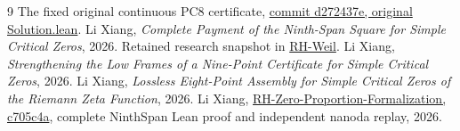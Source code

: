 \documentclass[11pt,a4paper]{article}
\begin{document}
\begin{thebibliography}{9}
 The fixed original continuous PC8 certificate,
\href{https://github.com/josusanmartin/riemann/blob/d272437e7ebeb17b87c8c3d7cece592aa23785ab/submissions/dani-bound-2026/proof/Solution.lean}{commit d272437e, original Solution.lean}.
 Li Xiang, \emph{Complete Payment of the Ninth-Span
Square for Simple Critical Zeros}, 2026. Retained research snapshot
in \href{https://github.com/lixiang90/RH-Weil}{RH-Weil}.
 Li Xiang, \emph{Strengthening the Low Frames of a
Nine-Point Certificate for Simple Critical Zeros}, 2026.
 Li Xiang, \emph{Lossless Eight-Point Assembly for
Simple Critical Zeros of the Riemann Zeta Function}, 2026.
 Li Xiang,
\href{https://github.com/lixiang90/RH-Zero-Proportion-Formalization/tree/c705c4aad2ad33e5358ce17e906b0dc51b1a83fe}{RH-Zero-Proportion-Formalization, c705c4a},
complete NinthSpan Lean proof and independent nanoda replay, 2026.
\end{thebibliography}
\end{document}
